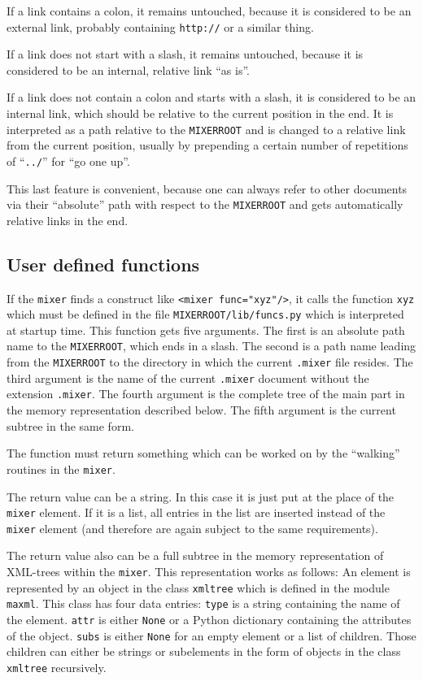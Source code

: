 \documentclass[a4paper,11pt]{article}
\newcommand{\mixer}{\texttt{mixer}}
\newcommand{\MIXERROOT}{\texttt{MIXERROOT}}
\begin{document}
If a link contains a colon, it remains untouched, because it is considered
to be an external link, probably containing \verb!http://! or a similar
thing.

If a link does not start with a slash, it remains untouched, because it
is considered to be an internal, relative link "`as is"'.

If a link does not contain a colon and starts with a slash, it is
considered to be an internal link, which should be relative to the
current position in the end. It is interpreted as a path relative to
the {\MIXERROOT} and is changed to a relative link from the current
position, usually by prepending a certain number of repetitions of
"`\verb!../!"' for "`go one up"'. 

This last feature is convenient, because one can always refer to other
documents via their "`absolute"' path with respect to the {\MIXERROOT}
and gets automatically relative links in the end.


\subsection{User defined functions}

If the {\mixer} finds a construct like \verb!<mixer func="xyz"/>!, it
calls the function \verb!xyz! which must be defined in the file
\MIXERROOT\verb!/lib/funcs.py! which is interpreted at startup time.
This function gets five arguments. The first is an absolute path name
to the \MIXERROOT, which ends in a slash. The second is a path name
leading from the {\MIXERROOT} to the directory in which the current
\verb!.mixer! file resides. The third argument is the name of the current
\verb!.mixer! document without the extension \verb!.mixer!. The fourth
argument is the complete tree of the main part in the memory representation
described below. The fifth argument is the current subtree in the same form.

The function
must return something which can be worked on by the "`walking"' routines
in the {\mixer}. 

The return value can be a string. In this case it is just put at the place
of the \verb!mixer! element. If it is a list, all entries in the list
are inserted instead of the \verb!mixer! element (and therefore are again
subject to the same requirements).

The return value also can be a full subtree in the memory representation of
XML-trees within the {\mixer}. This representation works as follows:
An element is represented by an object in the class \verb!xmltree! which 
is defined in the module \verb!maxml!. This class has four data entries:
\verb!type! is a string containing the name of the element. \verb!attr!
is either \verb!None! or a Python dictionary containing the attributes
of the object. \verb!subs! is either \verb!None! for an empty element
or a list of children. Those children can either be strings or subelements
in the form of objects in the class \verb!xmltree! recursively.
\end{document}
